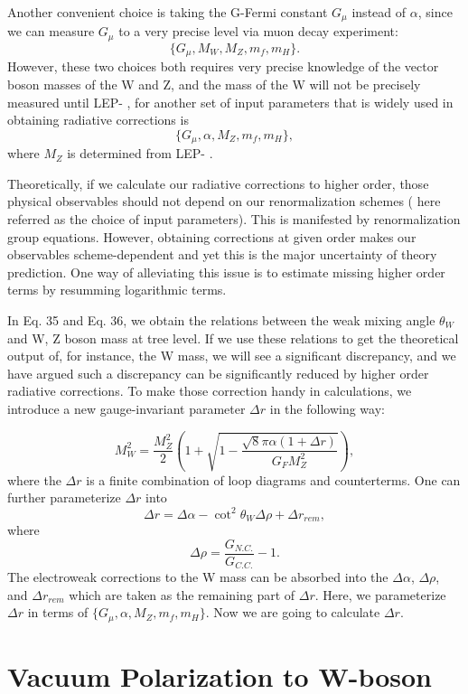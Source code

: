 \documentclass[secnumarabic, graphics,floatfix,nofootinbib,amsmath
tightenlines,nobibnotes,aps,prl,12pt]{revtex4-1}
\newcommand{\beeq}{\begin{equation}}
\newcommand{\eeeq}{\end{equation}}
\newcommand{\RN}[1]{%
  \textup{\uppercase\expandafter{\romannumeral#1}}%
}
\begin{document}
 Another convenient choice is taking the G-Fermi constant $G_{\mu}$ instead of $\alpha$, since we can measure $G_{\mu}$ to a very precise level via muon decay experiment:
 \beeq
 \{G_{\mu}, M_W, M_Z, m_f, m_H\}.
 \eeeq
 However, these two choices both requires very precise knowledge of the vector boson masses of the W and Z, and the mass of the W will not be precisely measured until LEP- \RN{2},
for another set of input parameters that is widely used in obtaining radiative corrections is
\beeq
 \{G_{\mu}, \alpha, M_Z, m_f, m_H\},
 \eeeq
where $M_Z$ is determined from LEP-\RN{1}. 

Theoretically, if we calculate our radiative corrections to higher order, those physical observables should not depend on our renormalization schemes ( here referred as the choice of input parameters). This is manifested by renormalization group equations. However, obtaining corrections at given order makes our observables scheme-dependent and yet this is the major uncertainty of theory prediction. One way of alleviating this issue is to estimate missing higher order terms by resumming logarithmic terms. 

In Eq. 35 and Eq. 36, we obtain the relations between the weak mixing angle $\theta_W$ and W, Z boson mass at tree level. If we use these relations to get the theoretical output of, for instance, the W mass, we will see a significant discrepancy, and we have argued such a discrepancy can be significantly reduced by higher order radiative corrections. To make those correction handy in calculations, we introduce a new gauge-invariant parameter $\Delta r$ in the following way:

\beeq
M_W^2=\frac{M_Z^2}{2}(1+\sqrt{1-\frac{\sqrt{8} \pi \alpha (1+\Delta r)}{G_F M_Z^2}}),
\eeeq
where the $\Delta r$ is a finite combination of loop diagrams and counterterms. One can further parameterize $\Delta r$ into
\beeq
\Delta r=\Delta \alpha- \cot^2{\theta_W}\Delta\rho+\Delta r_{rem},
\eeeq
where
\beeq
\Delta \rho=\frac{G_{N.C.}}{G_{C.C.}}-1.
\eeeq
The electroweak corrections to the W mass can be absorbed into the $\Delta \alpha$, $\Delta \rho$,  and $\Delta r_{rem}$ which are taken as the remaining part of $\Delta r$. Here, we parameterize $\Delta r$ in terms of $\{G_{\mu}, \alpha, M_Z, m_f, m_H\}$. Now we are going to calculate $\Delta r$.


\section{\label{sec:level1} Vacuum Polarization to W-boson}
\end{document}
